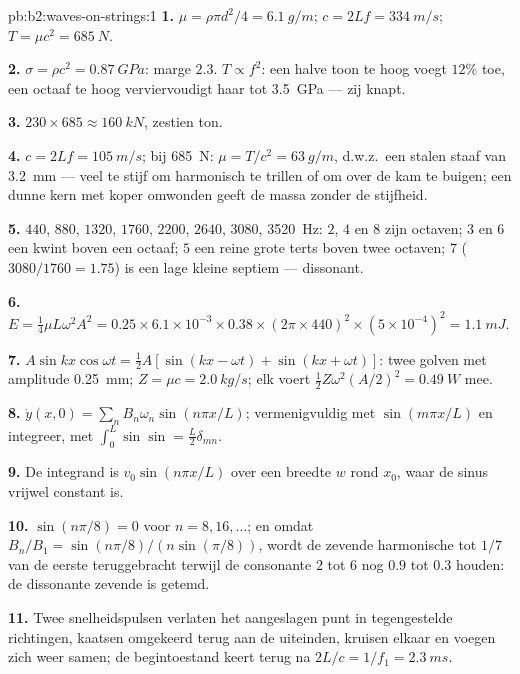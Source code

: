 \begin{solution}{pb:b2:waves-on-strings:1}
\textbf{1.} $\mu = \rho\pi d^2/4 = \qty{6.1}{g/m}$;
$c = 2Lf = \qty{334}{m/s}$; $T = \mu c^2
= \qty{685}{N}$.

\textbf{2.} $\sigma = \rho c^2 = \qty{0.87}{GPa}$: marge $2.3$.
$T \propto f^2$: een halve toon te hoog voegt $12\%$ toe, een octaaf te hoog
verviervoudigt haar tot \qty{3.5}{GPa} --- zij knapt.

\textbf{3.} $230 \times 685 \approx \qty{160}{kN}$, zestien ton.

\textbf{4.} $c = 2Lf = \qty{105}{m/s}$; bij \qty{685}{N}:
$\mu = T/c^2 = \qty{63}{g/m}$, d.w.z.\ een stalen staaf van \qty{3.2}{mm}
--- veel te stijf om harmonisch te trillen of om over de kam te buigen; een
dunne kern met koper omwonden geeft de massa zonder de stijfheid.

\textbf{5.} $440$, $880$, $1320$, $1760$, $2200$, $2640$, $3080$,
\qty{3520}{Hz}: $2$, $4$ en $8$ zijn octaven; $3$ en $6$ een kwint boven een
octaaf; $5$ een reine grote terts boven twee octaven; $7$
($3080/1760 = 1.75$) is een lage kleine septiem --- dissonant.

\textbf{6.}
$E = \tfrac14\mu L\omega^2A^2 = 0.25 \times 6.1 \times 10^{-3} \times 0.38 \times (2\pi
\times 440)^2 \times (5 \times 10^{-4})^2 = \qty{1.1}{mJ}$.

\textbf{7.}
$A\sin kx\cos\omega t = \tfrac12A[\sin(kx - \omega t) + \sin(kx + \omega t)]$:
twee golven met amplitude \qty{0.25}{mm}; $Z = \mu c = \qty{2.0}{kg/s}$; elk
voert $\tfrac12Z\omega^2(A/2)^2 = \qty{0.49}{W}$ mee.

\textbf{8.} $\dot y(x, 0) = \sum_nB_n\omega_n\sin(n\pi x/L)$; vermenigvuldig
met $\sin(m\pi x/L)$ en integreer, met
$\int_0^L\sin\sin = \tfrac L2\delta_{mn}$.

\textbf{9.} De integrand is $v_0\sin(n\pi x/L)$ over een breedte $w$ rond
$x_0$, waar de sinus vrijwel constant is.

\textbf{10.} $\sin(n\pi/8) = 0$ voor $n = 8, 16, \dots$; en omdat
$B_n/B_1 =
\sin(n\pi/8)/(n\sin(\pi/8))$, wordt de zevende harmonische tot
$1/7$ van de eerste teruggebracht terwijl de consonante $2$ tot $6$ nog
$0.9$ tot $0.3$ houden: de dissonante zevende is getemd.

\textbf{11.} Twee snelheidspulsen verlaten het aangeslagen punt in
tegengestelde richtingen, kaatsen omgekeerd terug aan de uiteinden, kruisen
elkaar en voegen zich weer samen; de begintoestand keert terug na
$2L/c = 1/f_1 = \qty{2.3}{ms}$.


\end{solution}
